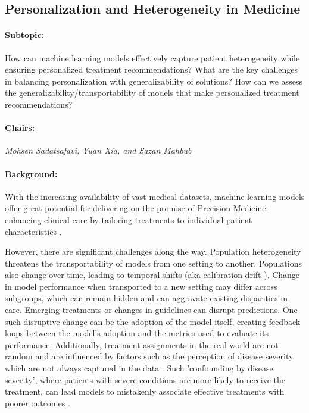\subsection{Personalization and Heterogeneity in Medicine}

\paragraph{Subtopic:} 
How can machine learning models effectively capture patient heterogeneity while ensuring personalized treatment recommendations?  What are the key challenges in balancing personalization with generalizability of solutions? How can we assess the generalizability/transportability of models that make personalized treatment recommendations? 

\paragraph{Chairs:}
\textit{Mohsen Sadatsafavi, Yuan Xia, and Sazan Mahbub}

\paragraph{Background:}

With the increasing availability of vast medical datasets, machine learning models offer great potential for delivering on the promise of Precision Medicine: enhancing clinical care by tailoring treatments to individual patient characteristics \citep{krishnan2023artificial}.

However, there are significant challenges along the way. Population heterogeneity threatens the transportability of models from one setting to another. Populations also change over time, leading to temporal shifts (aka calibration drift \citep{davis2017calibration}). Change in model performance when transported to a new setting may differ across subgroups, which can remain hidden and can aggravate existing disparities in care. Emerging treatments or changes in guidelines can disrupt predictions. One such disruptive change can be the adoption of the model itself, creating feedback loops between the model's adoption and the metrics used to evaluate its performance. Additionally, treatment assignments in the real world are not random and are influenced by factors such as the perception of disease severity, which are not always captured in the data \citep{kyriacou2016confounding}. Such 'confounding by disease severity', where patients with severe conditions are more likely to receive the treatment, can lead models to mistakenly associate effective treatments with poorer outcomes \citep{xia2024evaluating}.

